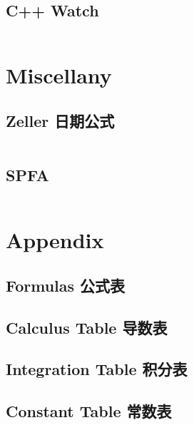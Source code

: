 \documentclass[titlepage, a4paper, 9pt]{article}
\begin{document}
\begin{multicols}{2}
\begin{spacing}{0.6}
                \subsection{C++ Watch}
                \inputminted{cpp}{src/Language/Watch.cpp}
			
			\section{Miscellany}
				\subsection{Zeller 日期公式}
				\inputminted{cpp}{src/Miscellany/Zeller 日期公式.cpp}
				\subsection{SPFA}
				\inputminted{cpp}{src/Miscellany/SPFA.cpp}
			
			\section{Appendix}
				\subsection{Formulas 公式表}
				
				\subsection{Calculus Table 导数表}
				
				\subsection{Integration Table 积分表}
				
				\subsection{Constant Table 常数表}
				

		\end{spacing}
		\endgroup
	\end{multicols}
	
\end{document}
